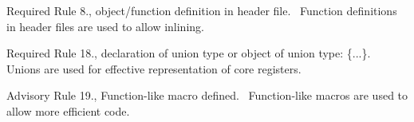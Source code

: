 \begin{DoxyItemize}
\item Required Rule 8., object/function definition in header file.~\newline
 Function definitions in header files are used to allow \textquotesingle{}inlining\textquotesingle{}.\end{DoxyItemize}
\begin{DoxyItemize}
\item Required Rule 18., declaration of union type or object of union type\+: \textquotesingle{}\{...\}\textquotesingle{}.~\newline
 Unions are used for effective representation of core registers.\end{DoxyItemize}
\begin{DoxyItemize}
\item Advisory Rule 19., Function-\/like macro defined.~\newline
 Function-\/like macros are used to allow more efficient code. \end{DoxyItemize}
